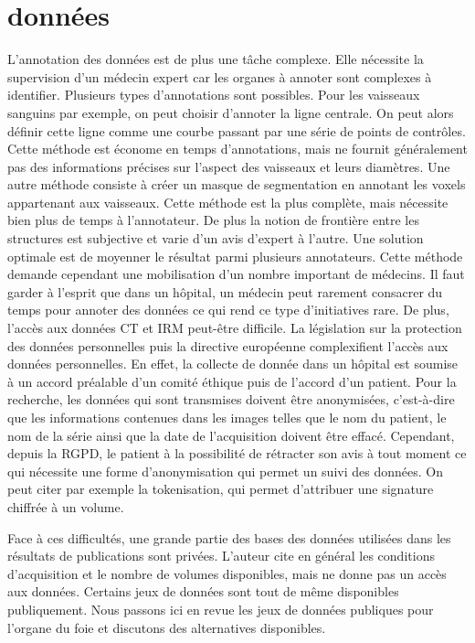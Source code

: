 \section{données}

L'annotation des données est de plus une tâche complexe. Elle nécessite la supervision d'un médecin expert car les organes à annoter sont complexes à identifier. Plusieurs types d'annotations sont possibles. Pour les vaisseaux sanguins par exemple, on peut choisir d'annoter la ligne centrale. On peut alors définir cette ligne comme une courbe passant par une série de points de contrôles. Cette méthode est économe en temps d'annotations, mais ne fournit généralement pas des informations précises sur l'aspect des vaisseaux et leurs diamètres. Une autre méthode consiste à créer un masque de segmentation en annotant les voxels appartenant aux vaisseaux. Cette méthode est la plus complète, mais nécessite bien plus de temps à l'annotateur. De plus la notion de frontière entre les structures est subjective et varie d'un avis d'expert à l'autre. Une solution optimale est de moyenner le résultat parmi plusieurs annotateurs. Cette méthode demande cependant une mobilisation d'un nombre important de médecins. Il faut garder à l'esprit que dans un hôpital, un médecin peut rarement consacrer du temps pour annoter des données ce qui rend ce type d'initiatives rare.
De plus, l'accès aux données CT et IRM peut-être difficile. La législation sur la protection des données personnelles puis la directive européenne complexifient l'accès aux données personnelles. En effet, la collecte de donnée dans un hôpital est soumise à un accord préalable d'un comité éthique puis de l'accord d'un patient. Pour la recherche, les données qui sont transmises doivent être anonymisées, c'est-à-dire que les informations contenues dans les images telles que le nom du patient, le nom de la série ainsi que la date de l'acquisition doivent être effacé. Cependant, depuis la RGPD, le patient à la possibilité de rétracter son avis à tout moment ce qui nécessite une forme d'anonymisation qui permet un suivi des données. On peut citer par exemple la tokenisation, qui permet d'attribuer une signature chiffrée à un volume.

Face à ces difficultés, une grande partie des bases des données utilisées dans les résultats de publications sont privées. L'auteur cite en général les conditions d'acquisition et le nombre de volumes disponibles, mais ne donne pas un accès aux données. Certains jeux de données sont tout de même disponibles publiquement. Nous passons ici en revue les jeux de données publiques pour l'organe du foie et discutons des alternatives disponibles.

